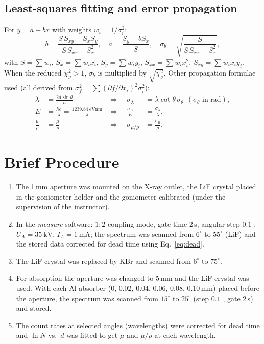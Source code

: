 \documentclass[11pt,a4paper]{article}
\begin{document}
\subsection{Least-squares fitting and error propagation}
For $y=a+bx$ with weights $w_i=1/\sigma_i^2$:
\begin{equation}
b=\frac{S\,S_{xy}-S_xS_y}{S\,S_{xx}-S_x^2},\quad
a=\frac{S_y-bS_x}{S},\quad
\sigma_b=\sqrt{\frac{S}{S\,S_{xx}-S_x^2}},
\end{equation}
with $S=\sum w_i$, $S_x=\sum w_ix_i$, $S_y=\sum w_iy_i$, $S_{xx}=\sum w_ix_i^2$, $S_{xy}=\sum w_ix_iy_i$. When the reduced $\chi^2_\nu>1$, $\sigma_b$ is multiplied by $\sqrt{\chi^2_\nu}$. Other propagation formulae used (all derived from $\sigma_f^2=\sum(\partial f/\partial x_i)^2\sigma_i^2$):
\begin{align}
\lambda&=\frac{2d\sin\theta}{n} &\Rightarrow\quad \sigma_\lambda&=\lambda\cot\theta\,\sigma_\theta\ \ (\sigma_\theta\text{ in rad}),\\
E&=\frac{hc}{\lambda}=\frac{1239.84\ \si{\electronvolt\nano\metre}}{\lambda} &\Rightarrow\quad \frac{\sigma_E}{E}&=\frac{\sigma_\lambda}{\lambda},\\
\frac{\mu}{\rho}&=\frac{\mu}{\rho} &\Rightarrow\quad \sigma_{\mu/\rho}&=\frac{\sigma_\mu}{\rho}.
\end{align}

\section{Brief Procedure}
\begin{enumerate}[nosep]
\item The 1\,mm aperture was mounted on the X-ray outlet, the LiF crystal placed in the goniometer holder and the goniometer calibrated (under the supervision of the instructor).
\item In the \emph{measure} software: $1{:}2$ coupling mode, gate time 2\,s, angular step $0.1^\circ$, $U_A=\SI{35}{\kilo\volt}$, $I_A=\SI{1}{\milli\ampere}$; the spectrum was scanned from $6^\circ$ to $55^\circ$ (LiF) and the stored data corrected for dead time using Eq.~\eqref{eq:dead}.
\item The LiF crystal was replaced by KBr and scanned from $6^\circ$ to $75^\circ$.
\item For absorption the aperture was changed to 5\,mm and the LiF crystal was used. With each Al absorber (0, 0.02, 0.04, 0.06, 0.08, 0.10\,mm) placed before the aperture, the spectrum was scanned from $15^\circ$ to $25^\circ$ (step $0.1^\circ$, gate 2\,s) and stored.
\item The count rates at selected angles (wavelengths) were corrected for dead time and $\ln N$ vs.\ $d$ was fitted to get $\mu$ and $\mu/\rho$ at each wavelength.
\end{enumerate}
\end{document}
